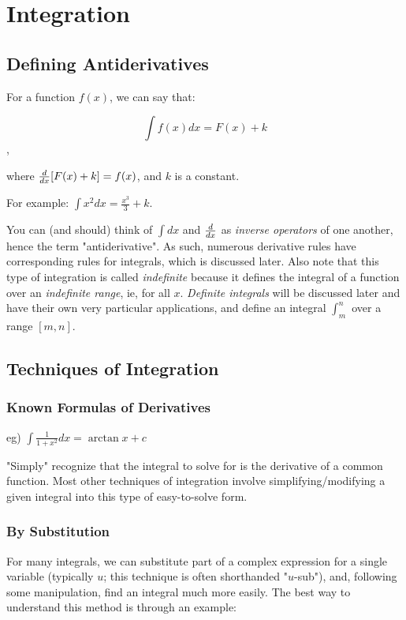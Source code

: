 \documentclass[12pt]{article}
\begin{document}
\newpage
\section{Integration}
\subsection{Defining Antiderivatives}

For a function $f(x)$, we can say that:

$$\int f(x) dx = F(x) + k$$,

where $\frac{d}{dx} [F(x)+k] = f(x)$, and $k$ is a constant.

For example: $\int x^2 dx = \frac{x^3}{3} + k$.

You can (and should) think of $\int  dx$ and $\frac{d}{dx}$ as \textit{inverse operators} of one another, hence the term "antiderivative". As such, numerous derivative rules have corresponding rules for integrals, which is discussed later. Also note that this type of integration is called \textit{indefinite} because it defines the integral of a function over an \textit{indefinite range}, ie, for all $x$. \textit{Definite integrals} will be discussed later and have their own very particular applications, and define an integral $\int_m^n$ over a range $[m,n]$.

\subsection{Techniques of Integration}
\subsubsection{Known Formulas of Derivatives}

eg) $\int \frac{1}{1+x^2} dx = \arctan x + c$

"Simply" recognize that the integral to solve for is the derivative of a common function. Most other techniques of integration involve simplifying/modifying a given integral into this type of easy-to-solve form.

\subsubsection{By Substitution}

For many integrals, we can substitute part of a complex expression for a single variable (typically $u$; this technique is often shorthanded "$u$-sub"), and, following some manipulation, find an integral much more easily. The best way to understand this method is through an example:
\end{document}
